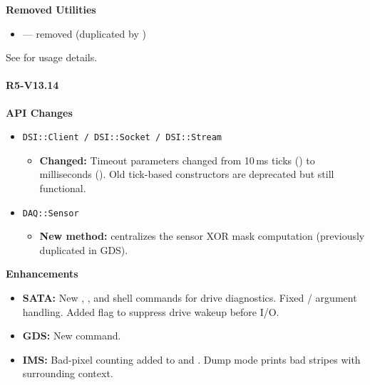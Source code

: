 \noindent\textbf{Removed Utilities}\par\nobreak
\begin{itemize}\compactlist
  \item {} --- removed (duplicated by )
\end{itemize}

See \href{DAQ_TOOLS.md}{} for usage details.


\paragraph{R5-V13.14}

\noindent\textbf{API Changes}\par\nobreak
\begin{itemize}\compactlist
  \item \texttt{DSI::Client / DSI::Socket / DSI::Stream}
  \begin{itemize}\compactlist
    \item \textbf{Changed:} Timeout parameters changed from 10\,ms ticks () to
      milliseconds (). Old tick-based constructors are deprecated
      but still functional.
  \end{itemize}
  \item \texttt{DAQ::Sensor}
  \begin{itemize}\compactlist
    \item \textbf{New method:}  centralizes the sensor XOR mask
      computation (previously duplicated in GDS).
  \end{itemize}
\end{itemize}
\noindent\textbf{Enhancements}\par\nobreak
\begin{itemize}\compactlist
  \item \textbf{SATA:} New , , and  shell commands for drive
    diagnostics. Fixed / argument handling. Added 
    flag to suppress drive wakeup before I/O.
  \item \textbf{GDS:} New  command.
  \item \textbf{IMS:} Bad-pixel counting added to  and
    . Dump mode prints bad stripes with surrounding
    context.
\end{itemize}

